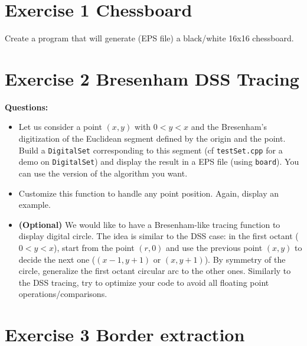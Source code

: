 \documentclass[a4paper, 11pt]{article}
\begin{document}
\section*{Exercise 1 \rm Chessboard}

\par Create a program that will generate (EPS file) a black/white 16x16 chessboard.


\section*{Exercise 2 \rm Bresenham DSS Tracing}

\noindent \textbf{Questions:}
\begin{itemize}
	\item Let us consider a point $(x,y)$ with $0<y<x$ and the Bresenham's digitization of the Euclidean segment defined by the origin and the point. Build a \texttt{DigitalSet} corresponding to this segment (cf \texttt{testSet.cpp} for a demo on \texttt{DigitalSet}) and display the result in a EPS file (using \texttt{board}). You can use the version of the algorithm you want.

	\item Customize this function to handle any point position. Again, display an example.

	\item \textbf{(Optional)} We would like to have a Bresenham-like tracing function to display digital circle. The idea is similar to the DSS case: in the first octant ($0 < y < x$), start from the point $(r,0)$ and use the previous point $(x,y)$ to decide the next one ($(x-1,y+1)$ or $(x,y+1)$). By symmetry of the circle, generalize the first octant circular arc to the other ones. Similarly to the DSS tracing, try to optimize your code to avoid all floating point operations/comparisons.
\end{itemize}



\section*{Exercise 3 \rm Border extraction}
\end{document}
